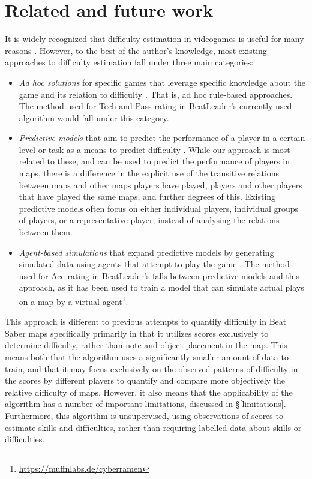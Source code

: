 \documentclass[12pt,a4paper]{article}
\begin{document}
\section{Related and future work}
\label{related_future_work}

It is widely recognized that difficulty estimation in videogames is useful for many reasons \cite{measuring_difficulty_single_player_games,measuring_difficulty_platform_games}. However, to the best of the author's knowledge, most existing approaches to difficulty estimation fall under three main categories:

\begin{itemize}

\item {\emph{Ad hoc solutions}} for specific games that leverage specific knowledge about the game and its relation to difficulty \cite{puzzle_difficulty_estimation, difficulty_sudoku, measuring_difficulty_platform_games}. That is, ad hoc rule-based approaches. The method used for Tech and Pass rating in BeatLeader's currently used algorithm would fall under this category.

\item {\emph{Predictive models}} that aim to predict the performance of a player in a certain level or task as a means to predict difficulty \cite{puzzle_difficulty_simulated_data}. While our approach is most related to these, and can be used to predict the performance of players in maps, there is a difference in the explicit use of the transitive relations between maps and other maps players have played, players and other players that have played the same maps, and further degrees of this. Existing predictive models often focus on either individual players, individual groups of players, or a representative player, instead of analysing the relations between them.

\item {\emph{Agent-based simulations}} that expand predictive models by generating simulated data using agents that attempt to play the game \cite{puzzle_difficulty_simulated_data}. The method used for Acc rating in BeatLeader's falls between predictive models and this approach, as it has been used to train a model that can simulate actual plays on a map by a virtual agent\footnote{\url{https://muffnlabs.de/cyberramen}}.

\end{itemize}

This approach is different to previous attempts to quantify difficulty in Beat Saber maps specifically primarily in that it utilizes scores exclusively to determine difficulty, rather than note and object placement in the map. This means both that the algorithm uses a significantly smaller amount of data to train, and that it may focus exclusively on the observed patterns of difficulty in the scores by different players to quantify and compare more objectively the relative difficulty of maps. However, it also means that the applicability of the algorithm has a number of important limitations, discussed in \S \ref{limitations}. Furthermore, this algorithm is unsupervised, using observations of scores to estimate skills and difficulties, rather than requiring labelled data about skills or difficulties.
\end{document}
